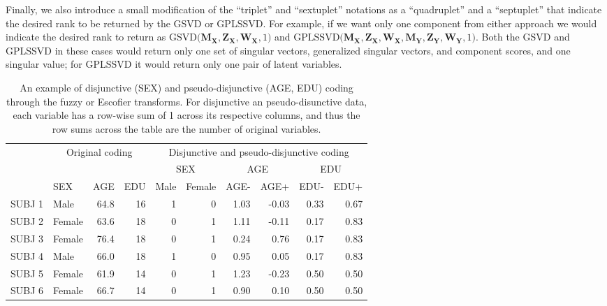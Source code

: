 \documentclass[12pt]{article}
\begin{document}
Finally, we also introduce a small modification of the ``triplet'' and
``sextuplet'' notations as a ``quadruplet'' and a ``septuplet'' that
indicate the desired rank to be returned by the GSVD or GPLSSVD. For
example, if we want only one component from either approach we would
indicate the desired rank to return as
\(\mathrm{GSVD(} {\mathbf M}_{{\mathbf X}}, {\mathbf Z}_{\mathbf X}, {\mathbf W}_{{\mathbf X}}, 1 \mathrm{)}\)
and
\(\mathrm{GPLSSVD(} {\mathbf M}_{\mathbf X}, {\mathbf Z}_{\mathbf X}, {\mathbf W}_{\mathbf X}, {\mathbf M}_{\mathbf Y}, {\mathbf Z}_{\mathbf Y}, {\mathbf W}_{\mathbf Y}, 1 \mathrm{)}\).
Both the GSVD and GPLSSVD in these cases would return only one set of
singular vectors, generalized singular vectors, and component scores,
and one singular value; for GPLSSVD it would return only one pair of
latent variables.

\begin{table}[!h]

\caption{\label{tab:unnamed-chunk-1}\label{table:disj} An example of disjunctive (SEX) and pseudo-disjunctive (AGE, EDU) coding through the fuzzy or Escofier transforms. For disjunctive an pseudo-disunctive data, each variable has a row-wise sum of 1 across its respective columns, and thus the row sums across the table are the number of original variables.}
\centering
\begin{tabular}{llrrrrrrrr}
\toprule
\multicolumn{1}{c}{ } & \multicolumn{3}{c}{Original coding} & \multicolumn{6}{c}{Disjunctive and pseudo-disjunctive coding} \\
\cmidrule(l{2pt}r{2pt}){2-4} \cmidrule(l{2pt}r{2pt}){5-10}
\multicolumn{4}{c}{ } & \multicolumn{2}{c}{SEX} & \multicolumn{2}{c}{AGE} & \multicolumn{2}{c}{EDU} \\
\cmidrule(l{2pt}r{2pt}){5-6} \cmidrule(l{2pt}r{2pt}){7-8} \cmidrule(l{2pt}r{2pt}){9-10}
  & SEX & AGE & EDU & Male & Female & AGE- & AGE+ & EDU- & EDU+\\
\midrule
SUBJ 1 & Male & 64.8 & 16 & 1 & 0 & 1.03 & -0.03 & 0.33 & 0.67\\
SUBJ 2 & Female & 63.6 & 18 & 0 & 1 & 1.11 & -0.11 & 0.17 & 0.83\\
SUBJ 3 & Female & 76.4 & 18 & 0 & 1 & 0.24 & 0.76 & 0.17 & 0.83\\
SUBJ 4 & Male & 66.0 & 18 & 1 & 0 & 0.95 & 0.05 & 0.17 & 0.83\\
SUBJ 5 & Female & 61.9 & 14 & 0 & 1 & 1.23 & -0.23 & 0.50 & 0.50\\
\addlinespace
SUBJ 6 & Female & 66.7 & 14 & 0 & 1 & 0.90 & 0.10 & 0.50 & 0.50\\
\bottomrule
\end{tabular}
\end{table}
\end{document}
